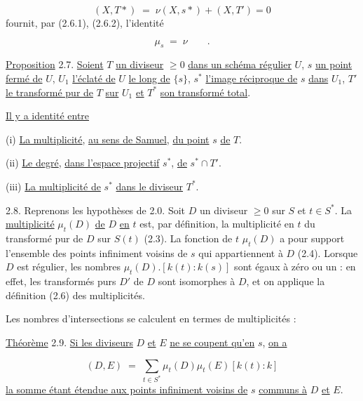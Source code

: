 \begin{equation*}
(X,T*) \;=\; \nu(X,s*) + (X,T') = 0
\end{equation*}
fournit, par (2.6.1), (2.6.2), l'identité

\begin{equation}\tag{2.6.3}
\mu_s \;=\; \nu \qquad .
\end{equation}


\underline{Proposition} 2.7. \underline{Soient} $T$ \underline{un diviseur} $\geq 0$ \underline{dans un schéma régulier} $U$, $s$ \underline{un point fermé de} $U$, $U_1$ \underline{l'éclaté de} $U$ \underline{le long de} $\{s\}$, $s^*$ \underline{l'image réciproque de} $s$ \underline{dans} $U_1$, $T'$ \underline{le transformé pur de} $T$ \underline{sur} $U_1$ \underline{et} $T^*$ \underline{son transformé total}.

\underline{Il y a identité entre}

(i) \underline{La multiplicité}, \underline{au sens de Samuel}, \underline{du point} $s$ \underline{de} $T$.

(ii) \underline{Le degré}, \underline{dans l'espace projectif} $s^*$, \underline{de} $s^* \cap T'$.

(iii) \underline{La multiplicité de} $s^*$ \underline{dans le diviseur} $T^*$.

2.8. Reprenons les hypothèses de 2.0. Soit $D$ un diviseur $\geq 0$ sur $S$ et $t \in S^*$. La \underline{multiplicité} $\mu_t(D)$ \underline{de} $D$ \underline{en} $t$ est, par définition, la multiplicité en $t$ du transformé pur de $D$ sur $S(t)$ (2.3). La fonction de $t$ $\mu_t(D)$ a pour support l'ensemble des points infiniment voisins de $s$ qui appartiennent à $D$ (2.4). Lorsque $D$ est régulier, les nombres $\mu_t(D).[k(t) : k(s)]$ sont égaux à zéro ou un : en effet, les transformés purs $D'$ de $D$ sont isomorphes à $D$, et on applique la définition (2.6) des multiplicités.

Les nombres d'intersections se calculent en termes de multiplicités :

\underline{Théorème} 2.9. \underline{Si les diviseurs} $D$ \underline{et} $E$ \underline{ne se coupent qu'en} $s$, \underline{on a}

\begin{equation*}
(D,E) \;=\; \sum_{t \in S^*} \mu_t(D)\mu_t(E)[k(t):k]
\end{equation*}
\underline{la somme étant étendue aux points infiniment voisins de} $s$ \underline{communs à} $D$ \underline{et} $E$.

